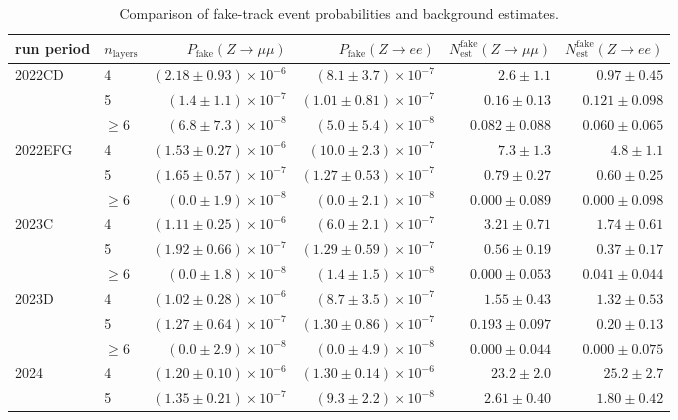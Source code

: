 \begin{table}[htbp]
\centering
\caption{Comparison of fake-track event probabilities and background estimates.}
\label{tab:fake_track_table34}
\begin{tabular}{llrrrr}
\hline
run period & $n_{\mathrm{layers}}$ & $P_{\mathrm{fake}}(Z\to\mu\mu)$ & $P_{\mathrm{fake}}(Z\to ee)$ & $N^{\mathrm{fake}}_{\mathrm{est}}(Z\to\mu\mu)$ & $N^{\mathrm{fake}}_{\mathrm{est}}(Z\to ee)$ \\
\hline
2022CD & 4 & $(2.18 \pm 0.93) \times 10^{-6}$ & $(8.1 \pm 3.7) \times 10^{-7}$ & $2.6 \pm 1.1$ & $0.97 \pm 0.45$ \\
 & 5 & $(1.4 \pm 1.1) \times 10^{-7}$ & $(1.01 \pm 0.81) \times 10^{-7}$ & $0.16 \pm 0.13$ & $0.121 \pm 0.098$ \\
 & $\geq 6$ & $(6.8 \pm 7.3) \times 10^{-8}$ & $(5.0 \pm 5.4) \times 10^{-8}$ & $0.082 \pm 0.088$ & $0.060 \pm 0.065$ \\
\hline
2022EFG & 4 & $(1.53 \pm 0.27) \times 10^{-6}$ & $(10.0 \pm 2.3) \times 10^{-7}$ & $7.3 \pm 1.3$ & $4.8 \pm 1.1$ \\
 & 5 & $(1.65 \pm 0.57) \times 10^{-7}$ & $(1.27 \pm 0.53) \times 10^{-7}$ & $0.79 \pm 0.27$ & $0.60 \pm 0.25$ \\
 & $\geq 6$ & $(0.0 \pm 1.9) \times 10^{-8}$ & $(0.0 \pm 2.1) \times 10^{-8}$ & $0.000 \pm 0.089$ & $0.000 \pm 0.098$ \\
\hline
2023C & 4 & $(1.11 \pm 0.25) \times 10^{-6}$ & $(6.0 \pm 2.1) \times 10^{-7}$ & $3.21 \pm 0.71$ & $1.74 \pm 0.61$ \\
 & 5 & $(1.92 \pm 0.66) \times 10^{-7}$ & $(1.29 \pm 0.59) \times 10^{-7}$ & $0.56 \pm 0.19$ & $0.37 \pm 0.17$ \\
 & $\geq 6$ & $(0.0 \pm 1.8) \times 10^{-8}$ & $(1.4 \pm 1.5) \times 10^{-8}$ & $0.000 \pm 0.053$ & $0.041 \pm 0.044$ \\
\hline
2023D & 4 & $(1.02 \pm 0.28) \times 10^{-6}$ & $(8.7 \pm 3.5) \times 10^{-7}$ & $1.55 \pm 0.43$ & $1.32 \pm 0.53$ \\
 & 5 & $(1.27 \pm 0.64) \times 10^{-7}$ & $(1.30 \pm 0.86) \times 10^{-7}$ & $0.193 \pm 0.097$ & $0.20 \pm 0.13$ \\
 & $\geq 6$ & $(0.0 \pm 2.9) \times 10^{-8}$ & $(0.0 \pm 4.9) \times 10^{-8}$ & $0.000 \pm 0.044$ & $0.000 \pm 0.075$ \\
\hline
2024 & 4 & $(1.20 \pm 0.10) \times 10^{-6}$ & $(1.30 \pm 0.14) \times 10^{-6}$ & $23.2 \pm 2.0$ & $25.2 \pm 2.7$ \\
 & 5 & $(1.35 \pm 0.21) \times 10^{-7}$ & $(9.3 \pm 2.2) \times 10^{-8}$ & $2.61 \pm 0.40$ & $1.80 \pm 0.42$ \\

\end{tabular}
\end{table}
